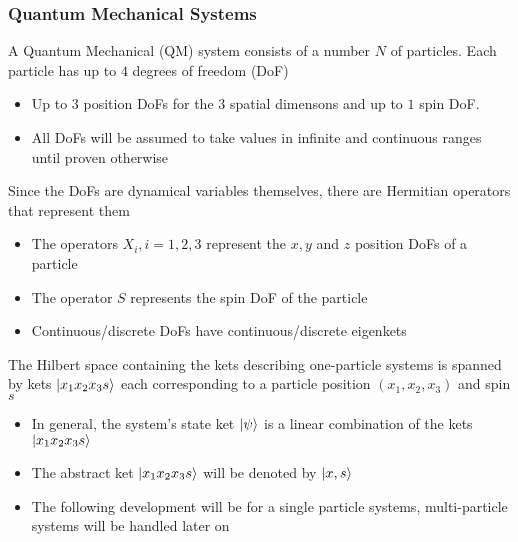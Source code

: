 \documentclass[8pt,t,mathserif,aspectratio=169]{beamer}
\begin{document}
\begin{frame}
  \frametitle{Quantum Mechanical Systems}
  \vspace{1mm}
  A Quantum Mechanical (QM) system consists of a number $N$ of particles. Each particle has up to $4$ degrees of freedom (DoF)
  \begin{itemize}
    \item Up to $3$ position DoFs for the $3$ spatial dimensons and up to $1$ spin DoF.
    \item All DoFs will be assumed to take values in infinite and continuous ranges until proven otherwise
  \end{itemize}
  Since the DoFs are dynamical variables themselves, there are Hermitian operators that represent them
  \begin{itemize}
    \item The operators $X_i, i = 1,2,3$ represent the $x,y$ and $z$ position DoFs of a particle
    \item The operator $S$ represents the spin DoF of the particle
    \item Continuous/discrete DoFs have continuous/discrete eigenkets
    \end{itemize}
  The Hilbert space containing the kets describing one-particle systems is spanned by kets $\ket{x_1 x_2 x_3 s}$ each corresponding to a particle position $(x_1,x_2,x_3)$ and spin $s$
  \begin{itemize}
    \item In general, the system's state ket $\ket{\psi}$ is a linear combination of the kets $\ket{x_1 x_2 x_3 s}$
    \item The abstract ket $\ket{x_1 x_2 x_3 s}$ will be denoted by $\ket{x,s}$
    \item The following development will be for a single particle systems, multi-particle systems will be handled later on
  \end{itemize}
\end{frame}
\end{document}

